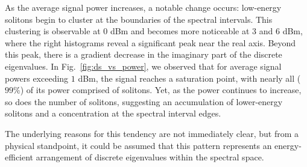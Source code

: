 As the average signal power increases, a notable change occurs: low-energy solitons begin to cluster at the boundaries of the spectral intervals. This clustering is observable at \(0\) dBm and becomes more noticeable at \(3\) and \(6\) dBm, where the right histograms reveal a significant peak near the real axis. Beyond this peak, there is a gradient decrease in the imaginary part of the discrete eigenvalues. In Fig.~\ref{fig:ds_vs_power}, we observed that for average signal powers exceeding \(1\) dBm, the signal reaches a saturation point, with nearly all (\(99\%\)) of its power comprised of solitons. Yet, as the power continues to increase, so does the number of solitons, suggesting an accumulation of lower-energy solitons and a concentration at the spectral interval edges.

The underlying reasons for this tendency are not immediately clear, but from a physical standpoint, it could be assumed that this pattern represents an energy-efficient arrangement of discrete eigenvalues within the spectral space.

